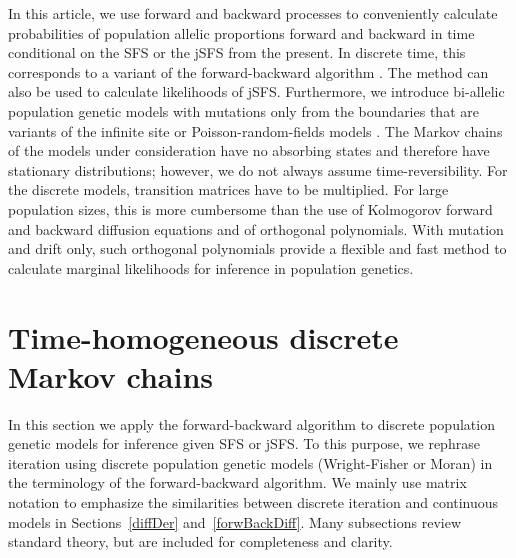 \documentclass[preprint]{elsarticle}
\begin{document}
In this article, we use forward and backward processes to conveniently calculate probabilities of population allelic proportions forward and backward in time conditional on the SFS or the jSFS from the present. In discrete time, this corresponds to a variant of the forward-backward algorithm \citep{Rabi86}. The method can also be used to calculate likelihoods of jSFS. Furthermore, we introduce bi-allelic population genetic models with mutations only from the boundaries that are variants of the infinite site or Poisson-random-fields models \citep{Kimu69,Sawy92}. The Markov chains of the models under consideration have no absorbing states and therefore have stationary distributions; however, we do not always assume time-reversibility. For the discrete models, transition matrices have to be multiplied. For large population sizes, this is more cumbersome than the use of Kolmogorov forward and backward diffusion equations and of orthogonal polynomials. With mutation and drift only, such orthogonal polynomials provide a flexible and fast method to calculate marginal likelihoods for inference in population genetics.

\section{Time-homogeneous discrete Markov chains}

In this section we apply the forward-backward algorithm to discrete population genetic models for inference given SFS or jSFS. To this purpose, we rephrase iteration using discrete population genetic models (Wright-Fisher or Moran) in the terminology of the forward-backward algorithm. We mainly use matrix notation to emphasize the similarities between discrete iteration and continuous models in Sections~\ref{diffDer} and~\ref{forwBackDiff}. Many subsections review standard theory, but are included for completeness and clarity. 
\end{document}
